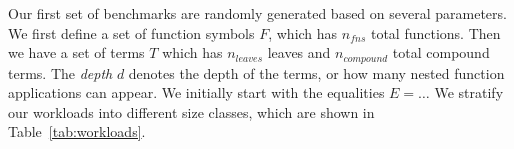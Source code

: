Our first set of benchmarks are randomly generated based on several parameters.
We first define a set of function symbols $F$, which has $n_{fns}$ total
functions. Then we have a set of terms $T$ which has $n_{leaves}$ leaves and
$n_{compound}$ total compound terms. The \emph{depth} $d$ denotes the depth of
the terms, or how many nested function applications can appear. We initially
start with the equalities $E = \ldots$  We stratify our workloads
into different size classes, which are shown in Table~\ref{tab:workloads}.









